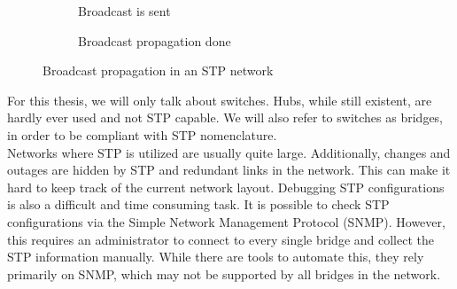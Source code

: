\begin{figure}[p]
    \begin{centering}
        \begin{subfigure}[b]{0.4\textwidth}
            \caption{Broadcast is sent}
        \end{subfigure}
        \hspace{1cm}
        \begin{subfigure}[b]{0.4\textwidth}
            \caption{Broadcast propagation done}
        \end{subfigure}    
    \end{centering}
    \caption{Broadcast propagation in an STP network}
    \label{fig:stp_example}
\end{figure}
For this thesis, we will only talk about switches.
Hubs, while still existent, are hardly ever used and not STP capable.
We will also refer to switches as bridges, in order to be compliant with STP nomenclature.\\

Networks where STP is utilized are usually quite large.
Additionally, changes and outages are hidden by STP and redundant links in the network.
This can make it hard to keep track of the current network layout.
Debugging STP configurations is also a difficult and time consuming task.
It is possible to check STP configurations via the Simple Network Management Protocol (SNMP).
However, this requires an administrator to connect to every single bridge and collect the STP information manually.
While there are tools to automate this, they rely primarily on SNMP, which may not be supported by all bridges in the network.\\

